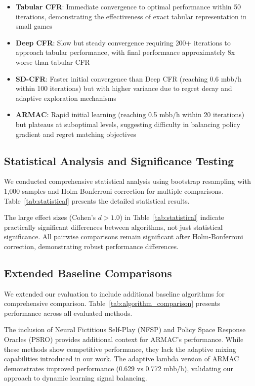 \documentclass{icml2024}
\begin{document}
\begin{itemize}
\item \textbf{Tabular CFR}: Immediate convergence to optimal performance within 50 iterations, demonstrating the effectiveness of exact tabular representation in small games
\item \textbf{Deep CFR}: Slow but steady convergence requiring 200+ iterations to approach tabular performance, with final performance approximately 8x worse than tabular CFR
\item \textbf{SD-CFR}: Faster initial convergence than Deep CFR (reaching 0.6 mbb/h within 100 iterations) but with higher variance due to regret decay and adaptive exploration mechanisms
\item \textbf{ARMAC}: Rapid initial learning (reaching 0.5 mbb/h within 20 iterations) but plateaus at suboptimal levels, suggesting difficulty in balancing policy gradient and regret matching objectives
\end{itemize}

\subsection{Statistical Analysis and Significance Testing}

We conducted comprehensive statistical analysis using bootstrap resampling with 1,000 samples and Holm-Bonferroni correction for multiple comparisons. Table~\ref{tab:statistical} presents the detailed statistical results.

The large effect sizes (Cohen's $d > 1.0$) in Table~\ref{tab:statistical} indicate practically significant differences between algorithms, not just statistical significance. All pairwise comparisons remain significant after Holm-Bonferroni correction, demonstrating robust performance differences.

\subsection{Extended Baseline Comparisons}

We extended our evaluation to include additional baseline algorithms for comprehensive comparison. Table~\ref{tab:algorithm_comparison} presents performance across all evaluated methods.

The inclusion of Neural Fictitious Self-Play (NFSP) and Policy Space Response Oracles (PSRO) provides additional context for ARMAC's performance. While these methods show competitive performance, they lack the adaptive mixing capabilities introduced in our work. The adaptive lambda version of ARMAC demonstrates improved performance (0.629 vs 0.772 mbb/h), validating our approach to dynamic learning signal balancing.
\end{document}
